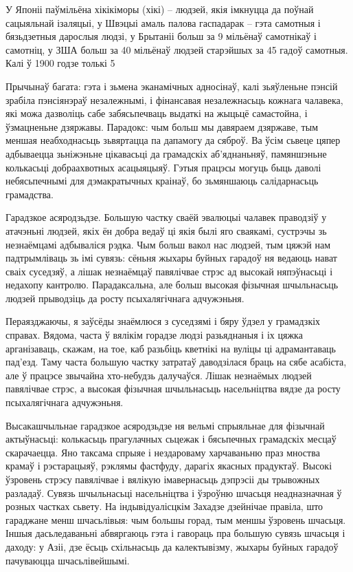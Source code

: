 У Японіі паўмільёна хікікіморы (хікі) – людзей, якія імкнуцца да поўнай сацыяльнай ізаляцыі, у Швэцыі амаль палова гаспадарак – гэта самотныя і бязьдзетныя дарослыя людзі, у Брытаніі больш за 9 мільёнаў самотнікаў і самотніц, у ЗША больш за 40 мільёнаў людзей старэйшых за 45 гадоў самотныя. Калі ў 1900 годзе толькі 5%

Прычынаў багата: гэта і зьмена эканамічных адносінаў, калі зьяўленьне пэнсій зрабіла пэнсіянэраў незалежнымі, і фінансавая незалежнасьць кожнага чалавека, які можа дазволіць сабе забясьпечваць выдаткі на жыцьцё самастойна, і ўзмацненьне дзяржавы. Парадокс: чым больш мы давяраем дзяржаве, тым меншая неабходнасьць зьвяртацца па дапамогу да сяброў. Ва ўсім сьвеце цяпер адбываецца зьніжэньне цікавасьці да грамадскіх аб'яднаньняў, памяншэньне колькасьці добраахвотных асацыяцыяў. Гэтыя працэсы могуць быць даволі небясьпечнымі для дэмакратычных краінаў, бо зьмяншаюць салідарнасьць грамадства.

Гарадзкое асяродзьдзе. Большую частку сваёй эвалюцыі чалавек праводзіў у атачэньні людзей, якіх ён добра ведаў ці якія былі яго сваякамі, сустрэчы зь незнаёмцамі адбываліся рэдка. Чым больш вакол нас людзей, тым цяжэй нам падтрымліваць зь імі сувязь: сёньня жыхары буйных гарадоў ня ведаюць нават сваіх суседзяў, а лішак незнаёмцаў павялічвае стрэс ад высокай няпэўнасьці і недахопу кантролю. Парадаксальна, але больш высокая фізычная шчыльнасьць людзей прыводзіць да росту псыхалягічнага адчужэньня.

Пераязджаючы, я заўсёды знаёмлюся з суседзямі і бяру ўдзел у грамадзкіх справах. Вядома, часта ў вялікім горадзе людзі разьяднаныя і іх цяжка арганізаваць, скажам, на тое, каб разьбіць кветнікі на вуліцы ці адрамантаваць пад'езд. Таму часта большую частку затратаў даводзілася браць на сябе асабіста, але ў працэсе звычайна хто-небудзь далучаўся. Лішак незнаёмых людзей павялічвае стрэс, а высокая фізычная шчыльнасьць насельніцтва вядзе да росту псыхалягічнага адчужэньня.

Высакашчыльнае гарадзкое асяродзьдзе ня вельмі спрыяльнае для фізычнай актыўнасьці: колькасьць прагулачных сьцежак і бясьпечных грамадскіх месцаў скарачаецца. Яно таксама спрыяе і нездароваму харчаваньню праз мноства крамаў і рэстарацыяў, рэклямы фастфуду, дарагіх якасных прадуктаў. Высокі ўзровень стрэсу павялічвае і вялікую імавернасьць дэпрэсіі ды трывожных разладаў. Сувязь шчыльнасьці насельніцтва і ўзроўню шчасьця неадназначная ў розных частках сьвету. На індывідуалісцкім Захадзе дзейнічае правіла, што гараджане менш шчасьлівыя: чым большы горад, тым меншы ўзровень шчасьця. Іншыя дасьледаваньні абвяргаюць гэта і гавораць пра большую сувязь шчасьця і даходу: у Азіі, дзе ёсьць схільнасьць да калектывізму, жыхары буйных гарадоў пачуваюцца шчасьлівейшымі.

